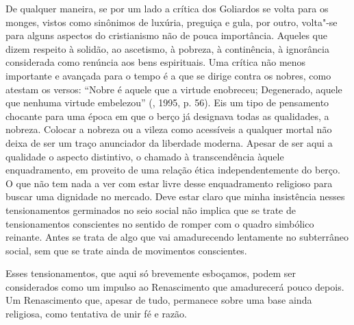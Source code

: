 De qualquer maneira, se por um lado a crítica dos Goliardos se volta
para os monges, vistos como sinônimos de luxúria, preguiça e gula, por
outro, volta"-se para alguns aspectos do cristianismo não de pouca
importância. Aqueles que dizem respeito à solidão, ao ascetismo, à
pobreza, à continência, à ignorância considerada como renúncia aos bens
espirituais. Uma crítica não menos importante e avançada para o tempo é
a que se dirige contra os nobres, como atestam os versos: ``Nobre é
aquele que a virtude enobreceu; Degenerado, aquele que nenhuma virtude
embelezou'' (, 1995, p. 56). Eis um tipo de pensamento
chocante para uma época em que o berço já designava todas as qualidades,
a nobreza. Colocar a nobreza ou a vileza como acessíveis a qualquer
mortal não deixa de ser um traço anunciador da liberdade moderna. Apesar
de ser aqui a qualidade o aspecto distintivo, o chamado
à transcendência àquele enquadramento, em proveito de uma relação ética
independentemente do berço. O que não tem nada a ver com estar livre
desse enquadramento religioso para buscar uma dignidade no mercado. Deve
estar claro que minha insistência nesses tensionamentos germinados no seio
social não implica que se trate de tensionamentos conscientes no sentido de romper com o
quadro simbólico reinante. Antes se trata de algo que vai amadurecendo
lentamente no subterrâneo social, sem que se trate ainda de movimentos
conscientes.

Esses tensionamentos, que aqui só brevemente esboçamos, podem ser
considerados como um impulso ao Renascimento que amadurecerá pouco
depois. Um Renascimento que, apesar de tudo, permanece sobre uma base
ainda religiosa, como tentativa de unir fé e razão.

